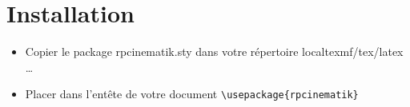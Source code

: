 \documentclass[a4paper,11pt]{article}                      %
\begin{document}
\section{Installation}
\begin{itemize}
\item Copier  le package rpcinematik.sty dans votre répertoire localtexmf/tex/latex \dots
\item Placer dans l'entête de votre document \verb"\usepackage{rpcinematik}"
\end{itemize}
\end{document}
